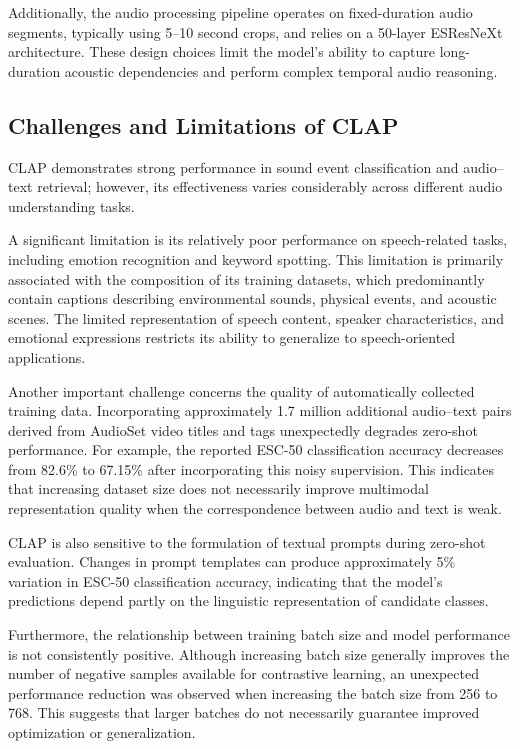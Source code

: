 \documentclass[pdflatex,sn-mathphys-num]{sn-jnl}%
\theoremstyle{thmstyleone}%
\theoremstyle{thmstyletwo}%
\theoremstyle{thmstylethree}%
\begin{document}
Additionally, the audio processing pipeline operates on fixed-duration audio segments, typically using 5--10 second crops, and relies on a 50-layer ESResNeXt architecture. These design choices limit the model's ability to capture long-duration acoustic dependencies and perform complex temporal audio reasoning.

\subsection{Challenges and Limitations of CLAP}

CLAP demonstrates strong performance in sound event classification and audio--text retrieval; however, its effectiveness varies considerably across different audio understanding tasks.

A significant limitation is its relatively poor performance on speech-related tasks, including emotion recognition and keyword spotting. This limitation is primarily associated with the composition of its training datasets, which predominantly contain captions describing environmental sounds, physical events, and acoustic scenes. The limited representation of speech content, speaker characteristics, and emotional expressions restricts its ability to generalize to speech-oriented applications.

Another important challenge concerns the quality of automatically collected training data. Incorporating approximately 1.7 million additional audio--text pairs derived from AudioSet video titles and tags unexpectedly degrades zero-shot performance. For example, the reported ESC-50 classification accuracy decreases from 82.6\% to 67.15\% after incorporating this noisy supervision. This indicates that increasing dataset size does not necessarily improve multimodal representation quality when the correspondence between audio and text is weak.

CLAP is also sensitive to the formulation of textual prompts during zero-shot evaluation. Changes in prompt templates can produce approximately 5\% variation in ESC-50 classification accuracy, indicating that the model's predictions depend partly on the linguistic representation of candidate classes.

Furthermore, the relationship between training batch size and model performance is not consistently positive. Although increasing batch size generally improves the number of negative samples available for contrastive learning, an unexpected performance reduction was observed when increasing the batch size from 256 to 768. This suggests that larger batches do not necessarily guarantee improved optimization or generalization.
\end{document}
